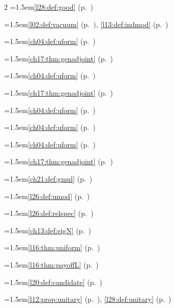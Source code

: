 \begin{multicols}{2}
\hangindent=1.5em\quad \ref{l28:def:good} (p.~\pageref{l28:def:good})\par
\hangindent=1.5em\quad \ref{l02:def:vacuum} (p.~\pageref{l02:def:vacuum}), \ref{l13:def:indmod} (p.~\pageref{l13:def:indmod})\par
\hangindent=1.5em\quad \ref{ch04:def:uform} (p.~\pageref{ch04:def:uform})\par
\hangindent=1.5em\quad \ref{ch17:thm:genadjoint} (p.~\pageref{ch17:thm:genadjoint})\par
\hangindent=1.5em\quad \ref{ch04:def:uform} (p.~\pageref{ch04:def:uform})\par
\hangindent=1.5em\quad \ref{ch17:thm:genadjoint} (p.~\pageref{ch17:thm:genadjoint})\par
\hangindent=1.5em\quad \ref{ch04:def:uform} (p.~\pageref{ch04:def:uform})\par
\hangindent=1.5em\quad \ref{ch04:def:uform} (p.~\pageref{ch04:def:uform})\par
\hangindent=1.5em\quad \ref{ch04:def:uform} (p.~\pageref{ch04:def:uform})\par
\hangindent=1.5em\quad \ref{ch17:thm:genadjoint} (p.~\pageref{ch17:thm:genadjoint})\par
\hangindent=1.5em\quad \ref{ch21:def:gmul} (p.~\pageref{ch21:def:gmul})\par
\hangindent=1.5em\quad \ref{l26:def:umod} (p.~\pageref{l26:def:umod})\par
\hangindent=1.5em\quad \ref{l26:def:relspec} (p.~\pageref{l26:def:relspec})\par
\hangindent=1.5em\quad \ref{ch13:def:eigN} (p.~\pageref{ch13:def:eigN})\par
\hangindent=1.5em\quad \ref{l16:thm:uniform} (p.~\pageref{l16:thm:uniform})\par
\hangindent=1.5em\quad \ref{l16:thm:payoffL} (p.~\pageref{l16:thm:payoffL})\par
\hangindent=1.5em\quad \ref{l20:def:candidate} (p.~\pageref{l20:def:candidate})\par
\hangindent=1.5em\quad \ref{l12:prop:unitary} (p.~\pageref{l12:prop:unitary}), \ref{l28:def:unitary} (p.~\pageref{l28:def:unitary})\par

\end{multicols}
